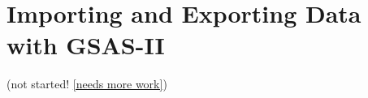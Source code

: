 \chapter{Importing and Exporting Data with GSAS-II}\label{Chap:ImportExport}

(not started! \ref{needs more work})